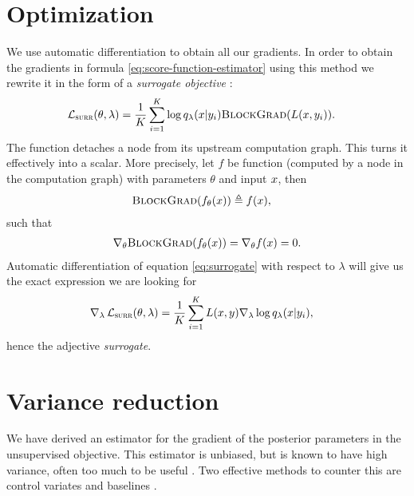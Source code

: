 \section{Optimization}
We use automatic differentiation \citep{Baydin+2017:AD} to obtain all our gradients. In order to obtain the gradients in formula \ref{eq:score-function-estimator} using this method we rewrite it in the form of a \textit{surrogate objective} \citep{Schulman+2015:surrogate}:
\begin{align}
  \label{eq:surrogate}
  \operatorname{\mathcal{L}}_{ \textsc{surr} }(\theta, \lambda) &= \frac{1}{K}\sum_{i=1}^K \log q_{\lambda}(x | y_i) \textsc{BlockGrad}( L(x, y_i) ).
\end{align}
The function \blockgrad detaches a node from its upstream computation graph. This turns it effectively into a scalar. More precisely, let $f$ be function (computed by a node in the computation graph) with parameters $\theta$ and input $x$, then
\begin{align*}
  \textsc{BlockGrad}(f_{\theta}( x )) &\triangleq f( x ),
\end{align*}
such that
\begin{align*}
  \nabla_{\theta}\textsc{BlockGrad}(f_{\theta}( x )) = \nabla_{\theta} f( x ) = 0.
\end{align*}
Automatic differentiation of equation \ref{eq:surrogate} with respect to $\lambda$ will give us the exact expression we are looking for
\begin{align*}
  \nabla_{\lambda} \operatorname{\mathcal{L}}_{ \textsc{surr} }(\theta, \lambda) &= \frac{1}{K}\sum_{i=1}^K L(x, y) \nabla_{\lambda} \log q_{\lambda}( x | y_i ),
\end{align*}
hence the adjective \textit{surrogate}.

\section{Variance reduction}
We have derived an estimator for the gradient of the posterior parameters in the unsupervised objective. This estimator is unbiased, but is known to have high variance, often too much to be useful \citep{Paisley+2012:VISS}. Two effective methods to counter this are control variates and baselines \citep{Ross:2006:SIM}.

